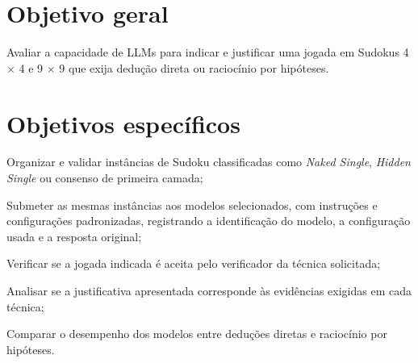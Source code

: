 
\section{Objetivo geral}

\begin{alineascomponto}
\item Avaliar a capacidade de LLMs para indicar e justificar uma jogada em Sudokus 4 $\times$ 4 e 9 $\times$ 9 que exija dedução direta ou raciocínio por hipóteses.
\end{alineascomponto}

\section{Objetivos específicos}

\begin{alineascomponto}
\item Organizar e validar instâncias de Sudoku classificadas como \textit{Naked Single}, \textit{Hidden Single} ou consenso de primeira camada;
\item Submeter as mesmas instâncias aos modelos selecionados, com instruções e configurações padronizadas, registrando a identificação do modelo, a configuração usada e a resposta original;
\item Verificar se a jogada indicada é aceita pelo verificador da técnica solicitada;
\item Analisar se a justificativa apresentada corresponde às evidências exigidas em cada técnica;
\item Comparar o desempenho dos modelos entre deduções diretas e raciocínio por hipóteses.
\end{alineascomponto}
